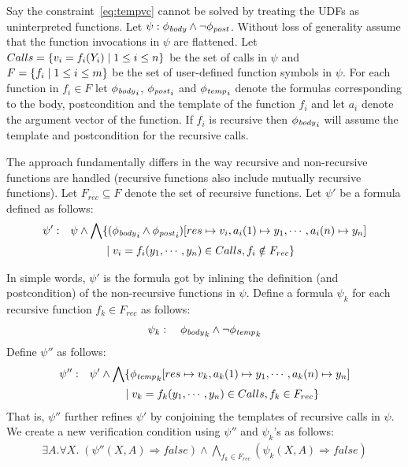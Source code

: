 \documentclass[a4paper,10pt]{article}
\begin{document}
Say the constraint~\ref{eq:tempvc} cannot be solved by treating the UDFs as uninterpreted functions. 
Let $\psi: \mathit{\phi_{body}} \wedge \neg \mathit{\phi_{post}}$. Without loss of generality assume that the function invocations in $\psi$ are flattened.
Let $Calls =\{ v_i = f_i(Y_i) \; | \; 1 \le i \le n \}$ be the set of calls in $\psi$ and
$F = \{ f_i \; | \; 1 \le i \le m \}$ be the set of user-defined function symbols in $\psi$. 
For each function in $f_i \in F$ let $\mathit{\phi_{body}}_i$, $\mathit{\phi_{post}}_i$ and $\mathit{\phi_{temp}}_i$ denote the formulas corresponding to the body, postcondition and the template of the function $f_i$ and let $a_i$ denote the argument vector of the function.
If $f_i$ is recursive then $\mathit{\phi_{body}}_i$ will assume the template and postcondition for the recursive calls.

The approach fundamentally differs in the way recursive and non-recursive functions are handled (recursive functions also include mutually recursive functions).
Let $F_{rec} \subseteq F$ denote the set of recursive functions.
Let $\psi'$ be a formula defined as follows: 
%
\begin{align*}
\psi': & \quad \psi \wedge  \bigwedge \{ (\mathit{\phi_{body}}_i \wedge \mathit{\phi_{post}}_i)[res \mapsto v_i, a_i(1) \mapsto y_1,\cdots, a_i(n) \mapsto y_n] \\
	   & \qquad \qquad  \; | \; v_i = f_i(y_1,\cdots,y_n) \in Calls, f_i \notin F_{rec} \}
\end{align*}

In simple words, $\psi'$ is the formula got by inlining the definition (and postcondition) of the non-recursive functions in $\psi$.
Define a formula $\psi_k$ for each recursive function $f_k \in F_{rec}$ as follows:
%
\begin{align*}
\psi_k: \quad \mathit{\phi_{body}}_k \wedge \neg \mathit{\phi_{temp}}_k
\end{align*}
%
Define $\psi''$ as follows:
%
\begin{align*}
\psi'': & \quad \psi' \wedge  \bigwedge \{ \mathit{\phi_{temp}}_k[res \mapsto v_k, a_k(1) \mapsto y_1,\cdots, a_k(n) \mapsto y_n] \\
	   & \qquad \qquad  \; | \; v_k = f_k(y_1,\cdots,y_n) \in Calls, f_k \in F_{rec} \}
\end{align*}
%
That is, $\psi''$ further refines $\psi'$ by conjoining the templates of recursive calls in $\psi$.
We create a new verification condition using $\psi''$ and $\psi_k$'s as follows:
%
\begin{align}
\exists A. \forall X. \; (\psi''(X,A) \Rightarrow false) \wedge \bigwedge_{f_k \in F_{rec}} (\psi_k(X,A) \Rightarrow false)
\end{align}
\end{document}
